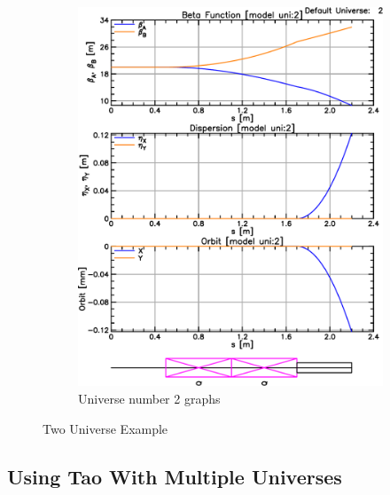 \documentclass{hitec}     %
\begin{document}
\begin{figure}[tb]
\begin{subfigure}[t]{0.49\textwidth}
    \includegraphics[width=\textwidth]{uni2.pdf}
    \caption{Universe number 2 graphs}
    \label{f:uni2}
  \end{subfigure}
  \caption{Two Universe Example}
\end{figure}

\subsection{Using Tao With Multiple Universes}
\end{document}
